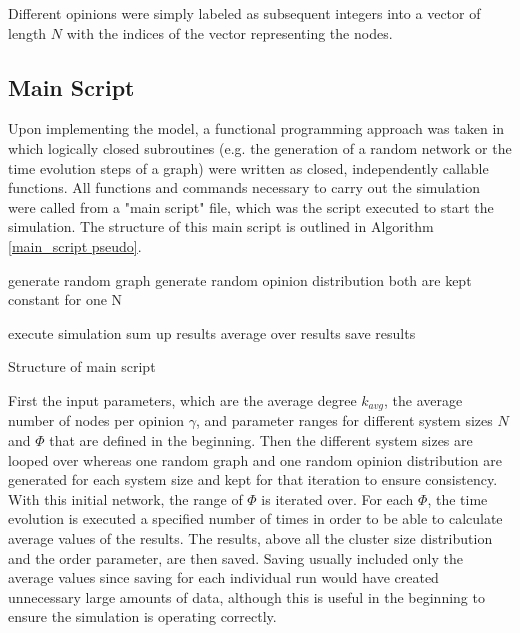 \documentclass[11pt]{article}
\begin{document}
Different opinions were simply labeled as subsequent integers into a vector of length $N$ with the indices of the vector representing the nodes.

\subsection{Main Script}

Upon implementing the model, a functional programming approach was taken in which logically closed subroutines (e.g. the generation of a random network or the time evolution steps of a graph) were written as closed, independently callable functions. All functions and commands necessary to carry out the simulation were called from a "main script" file, which was the script executed to start the simulation. The structure of this main script is outlined in Algorithm \ref{main_script pseudo}.\\


\begin{algorithm}[H]
\label{main_script pseudo}
 \SetAlgoLined
	{
	generate random graph\;
	generate random opinion distribution\;
	both are kept constant for one N\;
		{
			{
			execute simulation\;
			sum up results\;
			}
		average over results\;
		save results\;	
	
	
		}
		
	}	


 \caption{Structure of main script}
\end{algorithm}

\parskip 11pt

First the input parameters, which are the average degree $k_{avg}$, the average number of nodes per opinion $\gamma$, and parameter ranges for different system sizes $N$ and $\Phi$ that are defined in the beginning. Then the different system sizes are looped over whereas one random graph and one random opinion distribution are generated for each system size and kept for that iteration to ensure consistency. With this initial network, the range of $\Phi$ is iterated over. For each $\Phi$, the time evolution is executed a specified number of times in order to be able to calculate average values of the results. The results, above all the cluster size distribution and the order parameter, are then saved. Saving usually included only the average values since saving for each individual run would have created unnecessary large amounts of data, although this is useful in the beginning to ensure the simulation is operating correctly.
\end{document}
